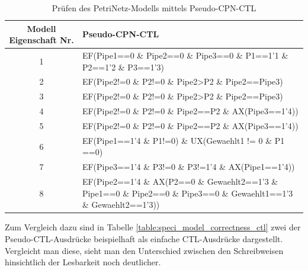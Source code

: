 \begin{table}[H]
	\begin{tabular}{|c|p{10cm}|}
		\hline \textbf{Modell Eigenschaft Nr.} & \textbf{Pseudo-CPN-CTL}\\ 
		\hline 1 & EF(Pipe1==0 \& Pipe2==0 \& Pipe3==0 \& \newline
		P1==1’1 \& P2==1’2 \& P3==1’3) \\ 
		\hline 2 & EF(Pipe2!=0 \& P2!=0 \& Pipe2>P2 \& \newline
		Pipe2==Pipe3)\\
		\hline 3 & EF(Pipe2!=0 \& P2!=0 \& Pipe2>P2 \& \newline
		Pipe2==Pipe3)\\
		\hline 4 & EF(Pipe2!=0 \& P2!=0 \& Pipe2==P2 \& \newline
		AX(Pipe3==1’4))\\
		\hline 5 & EF(Pipe2!=0 \& P2!=0 \& Pipe2==P2 \& \newline
		AX(Pipe3==1’4))\\
		\hline 6 & EF(Pipe1==1'4 \& P1!=0) \& UX(Gewaehlt1 != 0 \& P1 ==0)\\
		\hline 7 & EF(Pipe3==1’4 \& P3!=0 \& P3!=1’4 \& \newline
		AX(Pipe1==1’4))\\
		\hline 8 & EF(Pipe2==1’4 \& \newline
		AX(P2==0 \& Gewaehlt2==1’3 \& \newline
		Pipe1==0 \& Pipe2==0 \& Pipe3==0 \& \newline
		Gewaehlt1==1’3 \& Gewaehlt2==1’3))\\
		\hline
	\end{tabular}
	\caption{Prüfen des PetriNetz-Modells mittels Pseudo-CPN-CTL}
	\label{table:speci_model_correctness} 
\end{table}

Zum Vergleich dazu sind in Tabelle \ref{table:speci_model_correctness_ctl} zwei der Pseudo-CTL-Ausdrücke beispielhaft als einfache CTL-Ausdrücke dargestellt. Vergleicht man diese, sieht man den Unterschied zwischen den Schreibweisen hinsichtlich der Lesbarkeit noch deutlicher.

